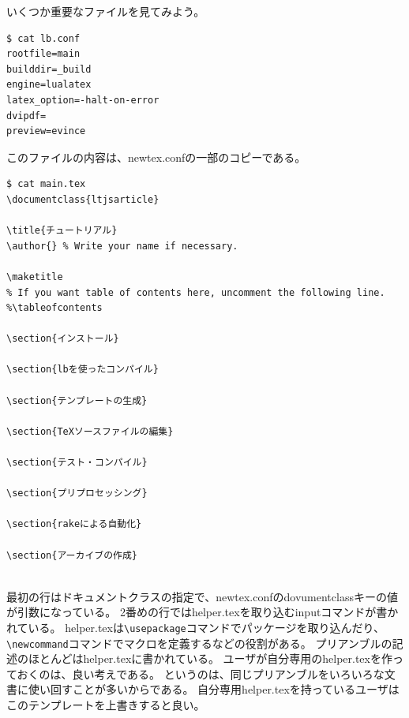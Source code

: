 いくつか重要なファイルを見てみよう。
\begin{verbatim}
$ cat lb.conf
rootfile=main
builddir=_build
engine=lualatex
latex_option=-halt-on-error
dvipdf=
preview=evince
\end{verbatim}
このファイルの内容は、newtex.confの一部のコピーである。
\begin{verbatim}
$ cat main.tex
\documentclass{ltjsarticle}

\title{チュートリアル}
\author{} % Write your name if necessary.

\maketitle
% If you want table of contents here, uncomment the following line.
%\tableofcontents

\section{インストール}
  
\section{lbを使ったコンパイル}
  
\section{テンプレートの生成}
  
\section{TeXソースファイルの編集}
  
\section{テスト・コンパイル}
  
\section{プリプロセッシング}
  
\section{rakeによる自動化}
  
\section{アーカイブの作成}
  

\end{verbatim}
最初の行はドキュメントクラスの指定で、newtex.confのdovumentclassキーの値が引数になっている。
2番めの行ではhelper.texを取り込むinputコマンドが書かれている。
helper.texは\verb|\usepackage|コマンドでパッケージを取り込んだり、\verb|\newcommand|コマンドでマクロを定義するなどの役割がある。
プリアンブルの記述のほとんどはhelper.texに書かれている。
ユーザが自分専用のhelper.texを作っておくのは、良い考えである。
というのは、同じプリアンブルをいろいろな文書に使い回すことが多いからである。
自分専用helper.texを持っているユーザはこのテンプレートを上書きすると良い。

